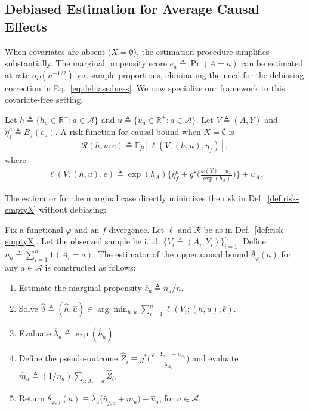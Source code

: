 \subsection{Debiased Estimation for Average Causal Effects}
When covariates are absent ($X = \emptyset$), the estimation procedure simplifies substantially. The marginal propensity score $e_a \triangleq \Pr(A=a)$ can be estimated at rate $o_P(n^{-1/2})$ via sample proportions, eliminating the need for the debiasing correction in Eq.~\eqref{eq:debiasedness}. We now specialize our framework to this covariate-free setting.
\begin{definition}\label{def:risk-emptyX}
    \normalfont
    Let $h \triangleq \{h_a \in \mathbb{R}^{+}: a \in \mathcal{A}\}$ and $u \triangleq \{u_a \in \mathbb{R}^{+}: a \in \mathcal{A}\}$. Let $V \triangleq (A,Y)$ and $\eta^a_f \triangleq B_f(e_a)$. A risk function for causal bound when $X=\emptyset$ is 
    \begin{align}\label{eq:risk-ate}
        \mathcal{R}(h,u;e) \triangleq \mathbb{E}_{P}[\ell(V;(h,u),\eta_f)],
    \end{align}
    where 
    \begin{align}\label{eq:loss-ate}
        \ell(V; (h,u), e ) \triangleq \exp({h_A})\big\{\eta^a_f + g^{\star}\big( \tfrac{\varphi(Y) - u_{A}}{\exp({h_A})} \big) \big\} + u_{A}. 
    \end{align}
\end{definition}
The estimator for the marginal case directly minimizes the risk in Def.~\ref{def:risk-emptyX} without debiasing: 
\begin{definition}\label{def:bound-average}
    \normalfont
    Fix a functional $\varphi$ and an $f$-divergence. Let $\ell$ and $\mathcal{R}$ be as in Def.~\ref{def:risk-emptyX}. Let the observed sample be i.i.d. $\{V_i \triangleq (A_i, Y_i)\}_{i=1}^{n}$. Define $n_a \triangleq \sum_{i=1}^{n}\boldsymbol{1}(A_i = a)$. The estimator of the upper causal bound $\overline{\theta}_{\varphi} (a)$ for any $a \in \mathcal{A}$ is constructed as follows:
    \begin{enumerate}[leftmargin=*]
        \item Estimate the marginal propensity $\widehat{e}_a \triangleq n_a /n $.
        \item Solve $\widehat{\vartheta} \triangleq (\widehat{h},\widehat{u}) \in \arg\min_{h,u}\sum_{i=1}^{n}\ell(V_i; (h,u), \widehat{e})$. 
        \item Evaluate $\widehat{\lambda}_a \triangleq \exp(\widehat{h}_a)$. 
        \item Define the pseudo-outcome $\widehat Z_i \equiv g^{\ast}\!\Big(\tfrac{\varphi(Y_i)-\widehat {u}_{A_i}}{\widehat\lambda_{A_i}}\Big)$ and evaluate $\widehat{m}_a \triangleq (1/n_a)\sum_{i:A_i = a}\widehat{Z}_i$. 
        \item Return $\widehat\theta_{\varphi,f}(a)
\equiv \widehat\lambda_a\Big(\widehat\eta_{f,a}+\widehat m_a\Big)+\widehat u_a$, for $a \in \mathcal{A}$. 
    \end{enumerate}
\end{definition}

